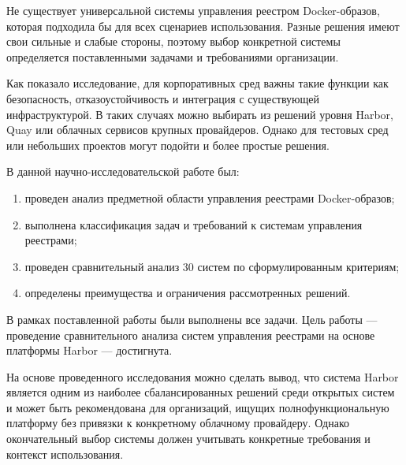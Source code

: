 
Не существует универсальной системы управления реестром Docker-образов, которая подходила бы для всех сценариев использования. Разные решения имеют свои сильные и слабые стороны, поэтому выбор конкретной системы определяется поставленными задачами и требованиями организации.

Как показало исследование, для корпоративных сред важны такие функции как безопасность, отказоустойчивость и интеграция с существующей инфраструктурой. В таких случаях можно выбирать из решений уровня Harbor, Quay или облачных сервисов крупных провайдеров. Однако для тестовых сред или небольших проектов могут подойти и более простые решения.

В данной научно-исследовательской работе был:
\begin{enumerate}
	\item проведен анализ предметной области управления реестрами Docker-образов;
	\item выполнена классификация задач и требований к системам управления реестрами;
	\item проведен сравнительный анализ 30 систем по сформулированным критериям;
	\item определены преимущества и ограничения рассмотренных решений.
\end{enumerate}

В рамках поставленной работы были выполнены все задачи. Цель работы — проведение сравнительного анализа систем управления реестрами на основе платформы Harbor — достигнута.

На основе проведенного исследования можно сделать вывод, что система Harbor является одним из наиболее сбалансированных решений среди открытых систем и может быть рекомендована для организаций, ищущих полнофункциональную платформу без привязки к конкретному облачному провайдеру. Однако окончательный выбор системы должен учитывать конкретные требования и контекст использования.

